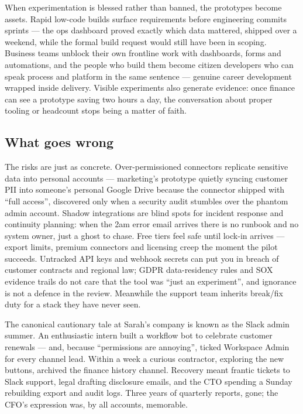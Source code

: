 When experimentation is blessed rather than banned, the prototypes become assets. Rapid low-code builds surface requirements before engineering commits sprints — the ops dashboard proved exactly which data mattered, shipped over a weekend, while the formal build request would still have been in scoping. Business teams unblock their own frontline work with dashboards, forms and automations, and the people who build them become citizen developers who can speak process and platform in the same sentence — genuine career development wrapped inside delivery. Visible experiments also generate evidence: once finance can see a prototype saving two hours a day, the conversation about proper tooling or headcount stops being a matter of faith.



\subsection{What goes wrong}


The risks are just as concrete. Over-permissioned connectors replicate sensitive data into personal accounts — marketing's prototype quietly syncing customer PII into someone's personal Google Drive because the connector shipped with ``full access'', discovered only when a security audit stumbles over the phantom admin account. Shadow integrations are blind spots for incident response and continuity planning: when the 2am error email arrives there is no runbook and no system owner, just a ghost to chase. Free tiers feel safe until lock-in arrives — export limits, premium connectors and licensing creep the moment the pilot succeeds. Untracked API keys and webhook secrets can put you in breach of customer contracts and regional law; GDPR data-residency rules and SOX evidence trails do not care that the tool was ``just an experiment'', and ignorance is not a defence in the review. Meanwhile the support team inherits break/fix duty for a stack they have never seen.


The canonical cautionary tale at Sarah's company is known as the Slack admin summer. An enthusiastic intern built a workflow bot to celebrate customer renewals — and, because ``permissions are annoying'', ticked Workspace Admin for every channel lead. Within a week a curious contractor, exploring the new buttons, archived the finance history channel. Recovery meant frantic tickets to Slack support, legal drafting disclosure emails, and the CTO spending a Sunday rebuilding export and audit logs. Three years of quarterly reports, gone; the CFO's expression was, by all accounts, memorable.



